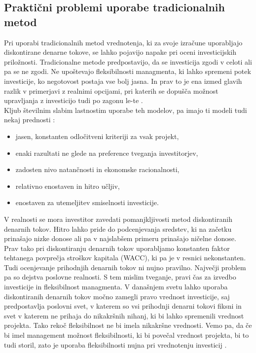 \subsection{Praktični problemi uporabe tradicionalnih metod}
Pri uporabi tradicionalnih metod vrednotenja, ki za svoje izračune uporabljajo diskontirane denarne tokove, se lahko pojavijo napake pri oceni investicijskih priložnosti. Tradicionalne metode predpostavijo, da se investicija zgodi v celoti ali pa se ne zgodi. Ne upoštevajo fleksibilnosti managmenta, ki lahko spremeni potek investicije, ko negotovost postaja vse bolj jasna. In prav to je ena izmed glavih razlik v primerjavi z realnimi opcijami, pri katerih se dopušča možnost upravljanja z investicijo tudi po zagonu le-te \cite[str. 65, 66]{Mun}.\\
Kljub številnim slabim lastnostim uporabe teh modelov, pa imajo ti modeli tudi nekaj prednosti \cite[str. 66]{Mun}:
\begin{itemize}
\item jasen, konstanten odločitveni kriteriji za vsak projekt,
\item enaki razultati ne glede na preference tveganja investitorjev,
\item zadosten nivo natančnosti in ekonomske racionalnosti,
\item relativno enostaven in hitro učljiv,
\item enostaven za utemeljitev smiselnosti investicije.
\end{itemize}
V realnosti se mora investitor zavedati pomanjkljivosti metod diskontiranih denarnih tokov. Hitro lahko pride do podcenjevanja sredstev, ki na začetku prinašajo nizke donose ali pa v najslabšem primeru prinašajo ničelne donose. Prav tako pri diskontiranju denarnih tokov uporabljamo konstanten faktor tehtanega povprečja stroškov kapitala (WACC), ki pa je v resnici nekonstanten. Tudi ocenjevanje prihodnjih denarnih tokov ni nujno pravilno. Največji problem pa so dejstva poslovne realnosti. S tem mislim tveganje, pravi čas za izvedbo investicije in fleksibilnost managmenta. V današnjem svetu lahko uporaba diskontiranih denarnih tokov močno zamegli pravo vrednost investicije, saj predpostavlja poslovni svet, v katerem so vsi prihodnji denarni tokovi fiksni in svet v katerem ne prihaja do nikakršnih nihanj, ki bi lahko spremenili vrednost projekta. Tako rekoč fleksibilnost ne bi imela nikakršne vrednosti. Vemo pa, da če bi imel management možnost fleksibilnosti, ki bi povečal vrednost projekta, bi to tudi storil, zato je uporaba fleksibilnosti nujna pri vrednotenju investicij \cite[str. 66]{Mun}.\\

